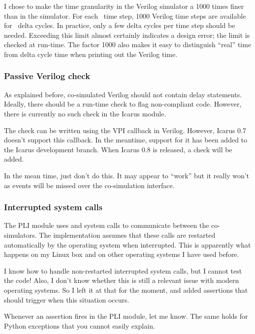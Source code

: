 I chose to make the time granularity in the Verilog simulator a 1000
times finer than in the \myhdl{} simulator. For each \myhdl\ time
step, 1000 Verilog time steps are available for \myhdl\ delta
cycles. In practice, only a few delta cycles per time step should be
needed. Exceeding this limit almost certainly indicates a design error;
the limit is checked at run-time. The factor 1000 also makes it
easy to distinguish ``real'' time from delta cycle time when printing
out the Verilog time.

\subsubsection{Passive Verilog check \label{cosim-icarus-pass}}

As explained before, co-simulated Verilog should not contain delay
statements. Ideally, there should be a run-time check to flag
non-compliant code. However, there is currently no such check in the
Icarus module.

The check can be written using the  VPI callback
in Verilog. However, Icarus 0.7 doesn't support this callback. In the
meantime, support for it has been added to the Icarus development
branch.  When Icarus 0.8 is released, a check will be added.

In the mean time, just don't do this. It may appear to ``work'' but it
really won't as events will be missed over the co-simulation
interface.

\subsubsection{Interrupted system calls \label{cosim-impl-syscalls}}

The PLI module uses  and  system calls to
communicate between the co-simulators. The implementation assumes that
these calls are restarted automatically by the operating system when
interrupted. This is apparently what happens on my Linux box and on
other operating systems I have used before.

I know how to handle non-restarted interrupted system calls, but I
cannot test the code! Also, I don't know whether this is still a
relevant issue with modern operating systems. So I left it
at that for the moment, and added assertions that should trigger
when this situation occurs.

Whenever an assertion fires in the PLI module, let me
know. The same holds for Python exceptions that you cannot
easily explain.

